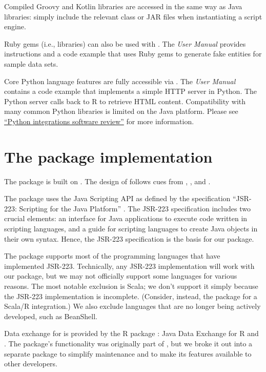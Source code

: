 Compiled Groovy and Kotlin libraries are accessed in the same way as Java libraries: simply include the relevant class or JAR files when instantiating a script engine.

Ruby gems (i.e., libraries) can also be used with . The \textit{ User Manual} provides instructions and a code example that uses Ruby gems to generate fake entities for sample data sets.

Core Python language features are fully accessible via . The \textit{ User Manual} contains a code example that implements a simple HTTP server in Python. The Python server calls back to R to retrieve HTML content. Compatibility with many common Python libraries is limited on the Java platform. Please see \hyperlink{python-integrations}{``Python integrations software review''} for more information.

\hypertarget{the-jsr223-package-implementation}{}
\section{The  package implementation}

The  package is built on . The design of  follows cues from ,  \citep{rscala}, and  \citep{v8pkg}.

The  package uses the Java Scripting API \citep{jsa} as defined by the specification “JSR-223: Scripting for the Java Platform” \citep{jsr223spec}. The JSR-223 specification includes two crucial elements: an interface for Java applications to execute code written in scripting languages, and a guide for scripting languages to create Java objects in their own syntax. Hence, the JSR-223 specification is the basis for our package.

The  package supports most of the programming languages that have implemented JSR-223. Technically, any JSR-223 implementation will work with our package, but we may not officially support some languages for various reasons. The most notable exclusion is Scala; we don't support it simply because the JSR-223 implementation is incomplete. (Consider, instead, the  package for a Scala/R integration.) We also exclude languages that are no longer being actively developed, such as BeanShell.

Data exchange for  is provided by the R package : Java Data Exchange for R and  \citep{jdx}. The  package's functionality was originally part of , but we broke it out into a separate package to simplify maintenance and to make its features available to other developers. %


